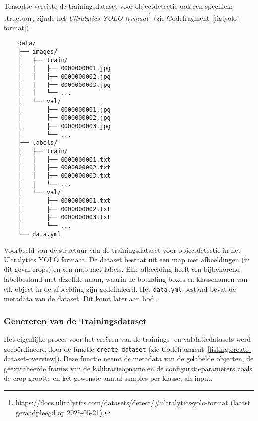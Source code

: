 Tenslotte vereiste de trainingsdataset voor objectdetectie ook een specifieke structuur, zijnde het 
\textit{Ultralytics YOLO formaat}\footnote{\url{https://docs.ultralytics.com/datasets/detect/\#ultralytics-yolo-format} (laatst geraadpleegd op 2025-05-21).} (zie Codefragment~\ref{fig:yolo-format}).

\begin{listing}[H]
  \begin{verbatim}
    data/
    ├── images/
    │   ├── train/
    │   │   ├── 0000000001.jpg
    │   │   ├── 0000000002.jpg
    │   │   ├── 0000000003.jpg
    │   │   └── ...
    │   └── val/
    │       ├── 0000000001.jpg
    │       ├── 0000000002.jpg
    │       ├── 0000000003.jpg
    │       └── ...
    ├── labels/
    │   ├── train/
    │   │   ├── 0000000001.txt
    │   │   ├── 0000000002.txt
    │   │   ├── 0000000003.txt
    │   │   └── ...
    │   └── val/
    │       ├── 0000000001.txt
    │       ├── 0000000002.txt
    │       ├── 0000000003.txt
    │       └── ...
    └── data.yml
  \end{verbatim}
  \caption[Voorbeeld van het Ultralytics YOLO Formaat]{
    \label{fig:yolo-format}
    Voorbeeld van de structuur van de trainingsdataset voor objectdetectie in het Ultralytics YOLO formaat.
    De dataset bestaat uit een map met afbeeldingen (in dit geval crops) en een map met labels.
    Elke afbeelding heeft een bijbehorend labelbestand met dezelfde naam, waarin de bounding boxes en klassenamen van elk object in de afbeelding zijn gedefinieerd.
    Het \texttt{data.yml} bestand bevat de metadata van de dataset. Dit komt later aan bod.
  }
\end{listing}

\subsubsection{Genereren van de Trainingsdataset}

Het eigenlijke proces voor het creëren van de trainings- en validatiedatasets werd gecoördineerd door de functie \texttt{create\_dataset} 
(zie Codefragment~\ref{listing:create-dataset-overview}). 
Deze functie neemt de metadata van de gelabelde objecten, de geëxtraheerde frames van de kalibratieopname 
en de configuratieparameters zoals de crop-grootte en het gewenste aantal samples per klasse, als input.

